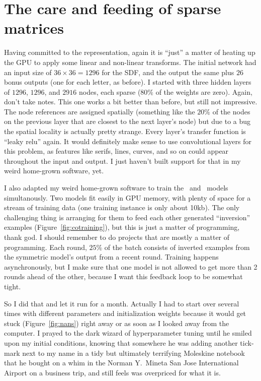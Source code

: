 \documentclass[twocolumn]{article}
\begin{document}
\section{The care and feeding of sparse matrices} \label{sec:neural}

Having committed to the representation, again it is ``just'' a matter
of heating up the GPU to apply some linear and non-linear transforms.
The initial network had an input size of $36 \times 36 = 1296$ for the
SDF, and the output the same plus $26$ bonus outputs (one for each
letter, as before). I started with three hidden layers of $1296$, $1296$,
and $2916$ nodes, each sparse ($80\%$ of the weights are zero). Again,
don't take notes. This one works a bit better than before, but still
not impressive. The node references are assigned spatially (something
like the $20\%$ of the nodes on the previous layer that are closest to
the next layer's node) but due to a bug the spatial locality is
actually pretty strange.
Every layer's transfer function is ``leaky relu'' again. It would
definitely make sense to use convolutional layers for this problem, as
features like serifs, lines, curves, and so on could appear throughout
the input and output. I just haven't built support for that in my
weird home-grown software, yet.

I also adapted my weird home-grown software to train the
\makeuppercase\ and \makelowercase\ models simultanously. Two models
fit easily in GPU memory, with plenty of space for a stream of
training data (one training instance is only about 10kb). The only
challenging thing is arranging for them to feed each other generated
``inversion'' examples (Figure~\ref{fig:cotraining}), but this is just
a matter of programming, thank god. I should remember to do projects
that are mostly a matter of programming. Each round, $25\%$ of the
batch consists of inverted examples from the symmetric model's output
from a recent round. Training happens asynchronously, but I make sure
that one model is not allowed to get more than 2 rounds ahead of the
other, because I want this feedback loop to be somewhat tight.

So I did that and let it run for a month. Actually I had to start over
several times with different parameters and initialization weights
because it would get stuck (Figure~\ref{fig:nans}) right away or as
soon as I looked away from the computer. I prayed to the dark wizard
of hyperparameter tuning until he smiled upon my initial conditions,
knowing that somewhere he was adding another tick-mark next to my name
in a tidy but ultimately terrifying Moleskine notebook that he bought
on a whim in the Norman Y.~Mineta San Jose International Airport on a
business trip, and still feels was overpriced for what it is.
\end{document}
